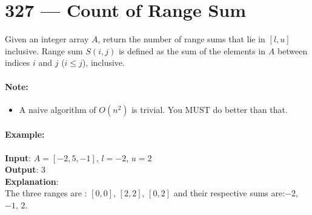 \section{327 --- Count of Range Sum}
Given an integer array $ A $, return the number of range sums that lie in $ [l, u] $ inclusive.
Range sum $ S(i, j) $ is defined as the sum of the elements in $ A $ between indices $ i $ and $ j $ ($ i \leq j $), inclusive.

\paragraph{Note:}
\begin{itemize}
\item A naive algorithm of $ O(n^2) $ is trivial. You MUST do better than that.
\end{itemize}

\paragraph{Example:}

\begin{flushleft}
\textbf{Input}: $ A = [-2,5,-1] $, \quad $ l = -2 $, \quad $ u = 2 $
\\
\textbf{Output}: 3 
\\
\textbf{Explanation}: 
\\
The three ranges are : $ [0,0] $, $ [2,2] $, $ [0,2] $ and their respective sums are:$  -2 $, $ -1 $, $ 2 $.
\end{flushleft}
